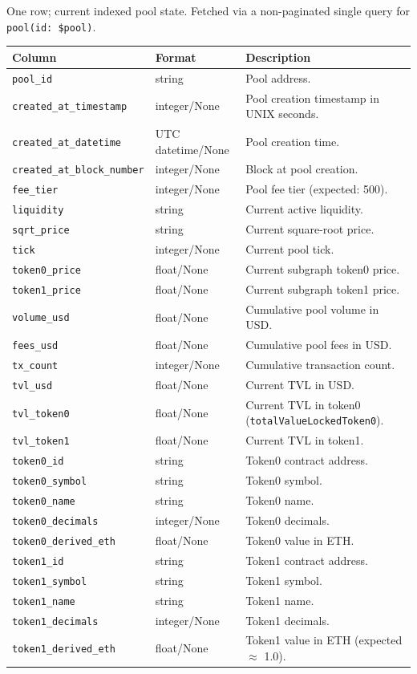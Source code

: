 \documentclass[11pt,a4paper]{article}
\begin{document}
One row; current indexed pool state. Fetched via a non-paginated single
query for \texttt{pool(id: \$pool)}.

\begin{xltabular}{\linewidth}{L{4.5cm}L{3.0cm}Y}
\toprule
\textbf{Column} & \textbf{Format} & \textbf{Description} \\
\midrule
\texttt{pool\_id} & string & Pool address. \\
\texttt{created\_at\_timestamp} & integer/None & Pool creation timestamp
  in UNIX seconds. \\
\texttt{created\_at\_datetime} & UTC datetime/None & Pool creation time. \\
\texttt{created\_at\_block\_number} & integer/None & Block at pool
  creation. \\
\texttt{fee\_tier} & integer/None & Pool fee tier (expected: 500). \\
\texttt{liquidity} & string & Current active liquidity. \\
\texttt{sqrt\_price} & string & Current square-root price. \\
\texttt{tick} & integer/None & Current pool tick. \\
\texttt{token0\_price} & float/None & Current subgraph token0 price. \\
\texttt{token1\_price} & float/None & Current subgraph token1 price. \\
\texttt{volume\_usd} & float/None & Cumulative pool volume in USD. \\
\texttt{fees\_usd} & float/None & Cumulative pool fees in USD. \\
\texttt{tx\_count} & integer/None & Cumulative transaction count. \\
\texttt{tvl\_usd} & float/None & Current TVL in USD. \\
\texttt{tvl\_token0} & float/None & Current TVL in token0
  (\texttt{totalValueLockedToken0}). \\
\texttt{tvl\_token1} & float/None & Current TVL in token1. \\
\texttt{token0\_id} & string & Token0 contract address. \\
\texttt{token0\_symbol} & string & Token0 symbol. \\
\texttt{token0\_name} & string & Token0 name. \\
\texttt{token0\_decimals} & integer/None & Token0 decimals. \\
\texttt{token0\_derived\_eth} & float/None & Token0 value in ETH. \\
\texttt{token1\_id} & string & Token1 contract address. \\
\texttt{token1\_symbol} & string & Token1 symbol. \\
\texttt{token1\_name} & string & Token1 name. \\
\texttt{token1\_decimals} & integer/None & Token1 decimals. \\
\texttt{token1\_derived\_eth} & float/None & Token1 value in ETH
  (expected $\approx$ 1.0). \\
\bottomrule
\end{xltabular}
\end{document}
